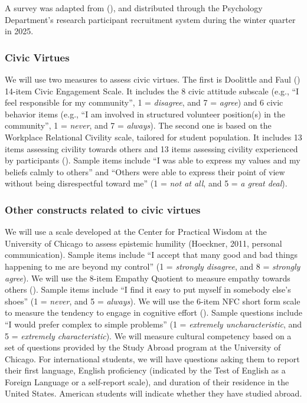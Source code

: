 \documentclass[
  man,
  floatsintext,
  longtable,
  nolmodern,
  notxfonts,
  notimes,
  colorlinks=true,linkcolor=blue,citecolor=blue,urlcolor=blue]{apa7}
\begin{document}
A survey was adapted from
(),
and distributed through the Psychology Department's research participant
recruitment system during the winter quarter in 2025.

\subsubsection{Civic Virtues}\label{civic-virtues}

We will use two measures to assess civic virtues. The first is Doolittle
and Faul ()
14-item Civic Engagement Scale. It includes the 8 civic attitude
subscale (e.g., ``I feel responsible for my community'', 1 =
\emph{disagree}, and 7 = \emph{agree}) and 6 civic behavior items (e.g.,
``I am involved in structured volunteer position(s) in the community'',
1 = \emph{never}, and 7 = \emph{always}). The second one is based on the
Workplace Relational Civility scale, tailored for student population. It
includes 13 items assessing civility towards others and 13 items
assessing civility experienced by participants
(). Sample items include ``I was able to express my values and
my beliefs calmly to others'' and ``Others were able to express their
point of view without being disrespectful toward me'' (1 = \emph{not at
all}, and 5 = \emph{a great deal}).

\subsubsection{Other constructs related to civic
virtues}\label{other-constructs-related-to-civic-virtues}

We will use a scale developed at the Center for Practical Wisdom at the
University of Chicago to assess epistemic humility (Hoeckner, 2011,
personal communication). Sample items include ``I accept that many good
and bad things happening to me are beyond my control'' (1 =
\emph{strongly disagree}, and 8 = \emph{strongly agree}). We will use
the 8-item Empathy Quotient to measure empathy towards others
(). Sample
items include ``I find it easy to put myself in somebody else's shoes''
(1 = \emph{never}, and 5 = \emph{always}). We will use the 6-item NFC
short form scale to measure the tendency to engage in cognitive effort
(). Sample questions include ``I would prefer
complex to simple problems'' (1 = \emph{extremely uncharacteristic}, and
5 = \emph{extremely characteristic}). We will measure cultural
competency based on a set of questions provided by the Study Abroad
program at the University of Chicago. For international students, we
will have questions asking them to report their first language, English
proficiency (indicated by the Test of English as a Foreign Language or a
self-report scale), and duration of their residence in the United
States. American students will indicate whether they have studied
abroad.
\end{document}
